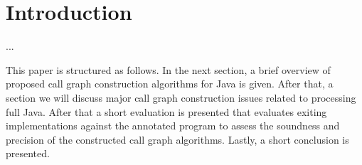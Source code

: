 \section{Introduction}
\label{section:introduction}

...

This paper is structured as follows. In the next section, a brief overview of proposed call graph construction algorithms for Java is given. After that, a section we will discuss major call graph construction issues related to processing full Java. After that a short evaluation is presented that evaluates exiting implementations against the annotated program to assess the soundness and precision of the constructed call graph algorithms. Lastly, a short conclusion is presented.